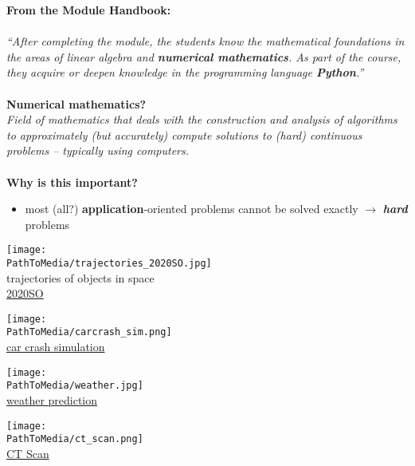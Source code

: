 %
\begin{frame}
\textbf{\color{header} From the Module Handbook:}\\~\\
\textit{``After completing the module, the students know the mathematical foundations in the areas of linear algebra and \textbf{numerical mathematics}. As part of the course, they acquire or deepen knowledge in the programming language \textbf{Python}.''}\\
~\\
\textbf{Numerical mathematics?}\\
\textit{Field of mathematics that deals with the construction and analysis of algorithms to approximately (but accurately) compute solutions to (hard) continuous problems -- typically using computers.}
~\\~\\
\textbf{\color{header} Why is this important?}~\\
\begin{itemize}
	\item most (all?) \textbf{application}-oriented problems cannot be solved exactly $\rightarrow$ \textit{\textbf{hard}} problems \vspace{0.3cm}
\end{itemize}
\begin{minipage}[t]{0.25\textwidth}\centering
\texttt{[image: \\PathToMedia/trajectories\_2020SO.jpg]}\\
trajectories of objects in space \\
	\hyperref{https://en.wikipedia.org/wiki/2020_SO\#/media/File:2020SO_b.gif}{}{}{2020SO} 
\end{minipage}
\begin{minipage}[t]{0.25\textwidth}\centering
	\texttt{[image: \\PathToMedia/carcrash\_sim.png]}\\
	\hyperref{https://www.emi.fraunhofer.de/de/geschaeftsfelder/automotive/forschung/archiv/Roentgen-Crashtest.html}{}{}{car crash simulation} 
\end{minipage}
\begin{minipage}[t]{0.25\textwidth}\centering
	\texttt{[image: \\PathToMedia/weather.jpg]}\\
	\hyperref{https://en.wikipedia.org/wiki/Numerical_weather_prediction}{}{}{weather prediction} 
\end{minipage}
\begin{minipage}[t]{0.25\textwidth} \centering
	\texttt{[image: \\PathToMedia/ct\_scan.png]}\\
	\hyperref{https://en.wikipedia.org/wiki/CT_scan}{}{}{CT Scan} 
\end{minipage}
\end{frame}
